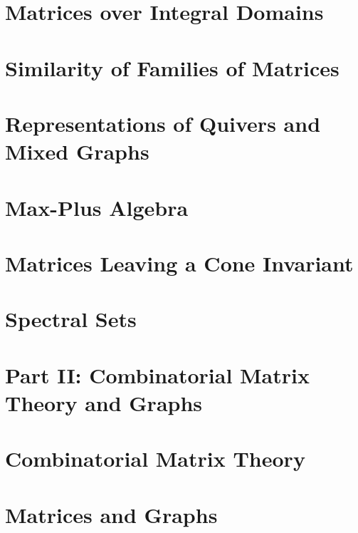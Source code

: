 \documentclass[a4paper]{article}
\begin{document}
\section{Matrices over Integral Domains}

\section{Similarity of Families of Matrices}

\section{Representations of Quivers and Mixed Graphs}

\section{Max-Plus Algebra}

\section{Matrices Leaving a Cone Invariant}

\section{Spectral Sets}

\section*{Part II: Combinatorial Matrix Theory and Graphs}

\section{Combinatorial Matrix Theory}

\section{Matrices and Graphs}
\end{document}
